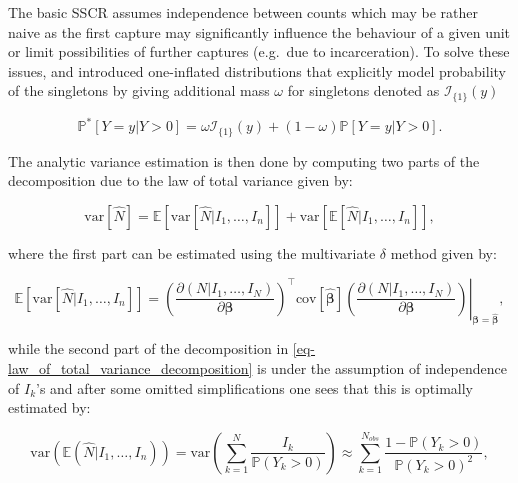 \documentclass[
]{jss}
\newcommand{\1}{\mathcal{I}} \newcommand{\bZero}{\boldsymbol{0}}
\begin{document}
The basic SSCR assumes independence between counts which may be rather
naive as the first capture may significantly influence the behaviour of
a given unit or limit possibilities of further captures (e.g.~due to
incarceration). To solve these issues, \citet{godwin2017estimation} and
\citet{ztoi-oizt-poisson} introduced one-inflated distributions that
explicitly model probability of the singletons by giving additional mass
\(\omega\) for singletons denoted as \(\mathcal{I}_{\{1\}}(y)\)
\citep[cf.][]{bohning2024one}

\begin{equation*}
  \mathbb{P}^{\ast}[Y=y|Y>0] =
  \omega\mathcal{I}_{\{1\}}(y)+(1-\omega)\mathbb{P}[Y=y|Y>0].
\end{equation*}

The analytic variance estimation is then done by computing two parts of
the decomposition due to the law of total variance given by:

\begin{equation}\label{eq-law_of_total_variance_decomposition}
  \text{var}[\hat{N}] = \mathbb{E}\left[\text{var}
  \left[\hat{N}|I_{1},\dots,I_{n}\right]\right] + 
  \text{var}\left[\mathbb{E}[\hat{N}|I_{1},\dots,I_{n}]\right],
\end{equation}

where the first part can be estimated using the multivariate \(\delta\)
method given by:

\begin{equation*}
  \mathbb{E}\left[\text{var} \left[\hat{N}|I_{1},\dots,I_{n}\right]\right] =
  \left.\left(\frac{\partial(N|I_1,\dots,I_N)}{\partial\boldsymbol{\beta}}\right)^\top
  \text{cov}\left[\hat{\boldsymbol{\beta}}\right]
  \left(\frac{\partial(N|I_1,\dots,I_N)}{\partial\boldsymbol{\beta}}\right)
  \right|_{\boldsymbol{\beta}=\hat{\boldsymbol{\beta}}},
\end{equation*}

while the second part of the decomposition in
\eqref{eq-law_of_total_variance_decomposition} is under the assumption
of independence of \(I_{k}\)'s and after some omitted simplifications
one sees that this is optimally estimated by:

\begin{equation*}
  \text{var}\left(\mathbb{E}(\hat{N}|I_{1},\dots,I_{n})\right) =
  \text{var}\left(\sum_{k=1}^{N}\frac{I_{k}}{\mathbb{P}(Y_{k}>0)}\right)
  \approx\sum_{k=1}^{N_{obs}}\frac{1-\mathbb{P}(Y_{k}>0)}{\mathbb{P}(Y_{k}>0)^{2}},
\end{equation*}
\end{document}
